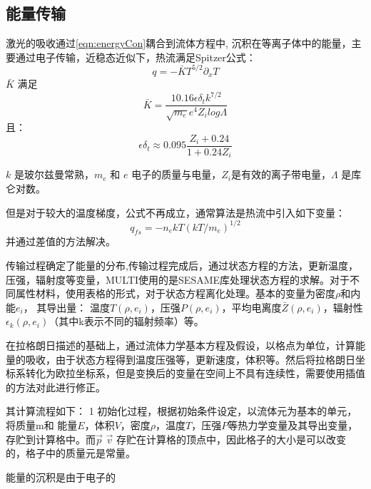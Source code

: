 \subsection{能量传输}
激光的吸收通过\ref{eqn:energyCon}耦合到流体方程中,
沉积在等离子体中的能量，主要通过电子传输，近稳态近似下，热流满足Spitzer公式：
\begin{equation}
\label{eqn:heatFlux}
q=-\bar{K} T^{5/2} {\partial}_x T
\end{equation} 
$\bar{K}$ 满足
\begin{equation}
\label{eqn:kBar}
\bar{K}=\frac{10.16 \epsilon \delta_t k^{7/2}}{\sqrt{m_e}e^4 Z_i log \Lambda}
\end{equation} 
且：
\begin{equation}
\label{eqn:heatFlux1}
\epsilon \delta_t \approx 0.095 \frac{Z_i+0.24}{1+0.24Z_i}
\end{equation} 

$k$ 是玻尔兹曼常熟，$m_e$ 和 $e$ 电子的质量与电量，$Z_i$是有效的离子带电量，$\Lambda$
是库仑对数。

但是对于较大的温度梯度，公式不再成立，通常算法是热流中引入如下变量：
\begin{equation}
\label{eqn:freeStream}
q_{fs}=-n_e k T (k T / m_e)^{1/2}
\end{equation} 
并通过差值的方法解决。





传输过程确定了能量的分布,传输过程完成后，通过状态方程的方法，更新温度，压强，辐射度等变量，MULTI使用的是SESAME库处理状态方程的求解。对于不同属性材料，使用表格的形式，对于状态方程离化处理。基本的变量为密度$\rho$和内能$e_i$， 其导出量： 温度$T(\rho, e_i)$，压强$P(\rho, e_i)$，平均电离度$\bar{Z}(\rho, e_i)$，辐射性$\epsilon_k(\rho, e_i)$（其中k表示不同的辐射频率）等。




在拉格朗日描述的基础上，通过流体力学基本方程及假设，以格点为单位，计算能量的吸收，由于状态方程得到温度压强等，更新速度，体积等。然后将拉格朗日坐标系转化为欧拉坐标系，但是变换后的变量在空间上不具有连续性，需要使用插值的方法对此进行修正。



其计算流程如下：
1 初始化过程，根据初始条件设定，以流体元为基本的单元，将质量m和 能量$E$，体积$V$，密度$\rho$，温度$T$，压强$P$等热力学变量及其导出变量，存贮到计算格中。而$\vec{p}$ $\vec{v}$ 存贮在计算格的顶点中，因此格子的大小是可以改变的，格子中的质量元是常量。

能量的沉积是由于电子的






